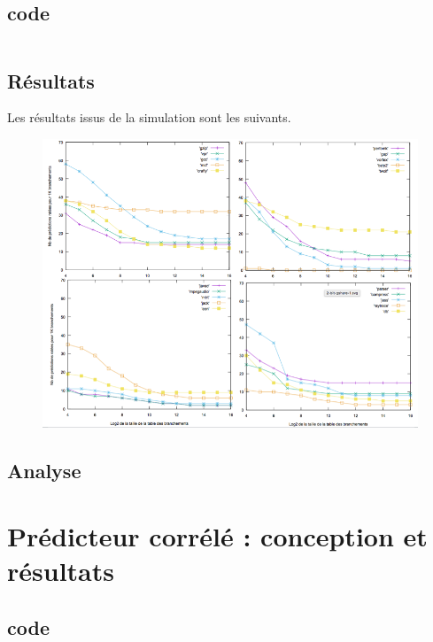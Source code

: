 \documentclass[a4paper]{article}
\begin{document}
\subsection{code}

\small
\begin{verbatim}
\end{verbatim}
\normalsize

\subsection{Résultats}

Les résultats issus de la simulation sont les suivants.
\begin{figure}[t]
\includegraphics[width=\linewidth]{2-bit-gshare.png}
\centering
\end{figure}

\subsection{Analyse}

\section{Prédicteur corrélé : conception et résultats}
\subsection{code}
\end{document}

